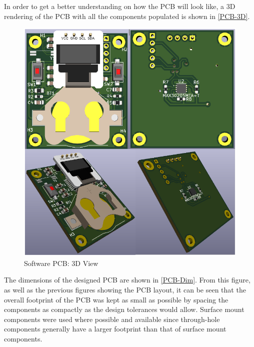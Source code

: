 \noindent
In order to get a better understanding on how the PCB will look like, a 3D rendering of the PCB with all the components populated is shown in \autoref{PCB-3D}.
\begin{figure}[H]
	\centering
	\includegraphics[scale=0.8]{img/PCB-3D.PNG}
	\caption{Software PCB: 3D View}
	\label{PCB-3D}
\end{figure}
\noindent
The dimensions of the designed PCB are shown in \autoref{PCB-Dim}. From this figure, as well as the previous figures showing the PCB layout, it can be seen that the overall footprint of the PCB was kept as small as possible by spacing the components as compactly as the design tolerances would allow. Surface mount components were used where possible and available since through-hole components generally have a larger footprint than that of surface mount components.
